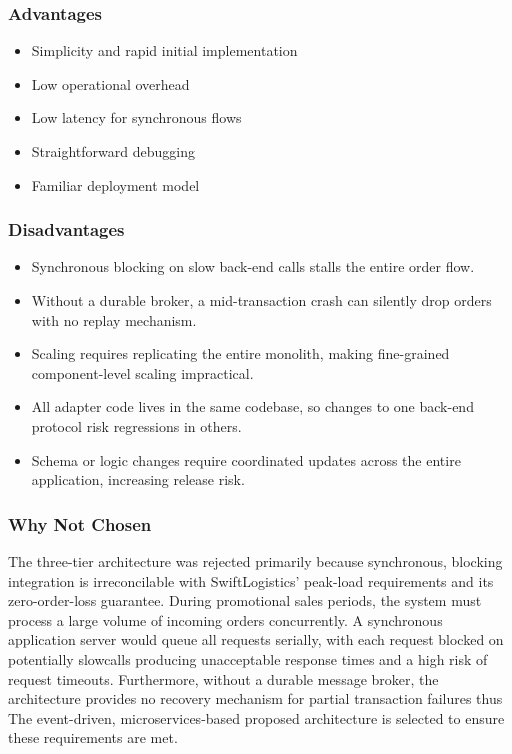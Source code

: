 \subsubsection{Advantages}

\begin{itemize}
    \item Simplicity and rapid initial implementation
    \item Low operational overhead
    \item Low latency for synchronous flows
    \item Straightforward debugging
    \item Familiar deployment model
\end{itemize}

\subsubsection{Disadvantages}

\begin{itemize}
    \item Synchronous blocking on slow back-end calls stalls the entire order flow.
    \item Without a durable broker, a mid-transaction crash can silently drop orders with no replay mechanism.
    \item Scaling requires replicating the entire monolith, making fine-grained component-level scaling impractical.
    \item All adapter code lives in the same codebase, so changes to one back-end protocol risk regressions in others.
    \item Schema or logic changes require coordinated updates across the entire application, increasing release risk.
\end{itemize}

\subsubsection{Why Not Chosen}

The three-tier architecture was rejected primarily because synchronous, blocking integration is irreconcilable with SwiftLogistics' peak-load requirements and its zero-order-loss guarantee. During promotional sales periods, the system must process a large volume of incoming orders concurrently. A synchronous application server would queue all requests serially, with each request blocked on potentially slowcalls producing unacceptable response times and a high risk of request timeouts. Furthermore, without a durable message broker, the architecture provides no recovery mechanism for partial transaction failures thus The event-driven, microservices-based proposed architecture is selected to ensure these requirements are met.
